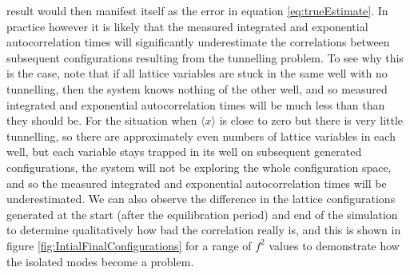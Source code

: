 \documentclass[12pt]{article}
\begin{document}
result would then manifest itself as the error in equation \ref{eq:trueEstimate}. In practice however it is likely that the measured integrated and exponential autocorrelation times will significantly underestimate the correlations between subsequent configurations resulting from the tunnelling problem. To see why this is the case, note that if all lattice variables are stuck in the same well with no tunnelling, then the system knows nothing of the other well, and so measured integrated and exponential autocorrelation times will be much less than than they should be. For the situation when $\langle x \rangle$ is close to zero but there is very little tunnelling, so there are approximately even numbers of lattice variables in each well, but each variable stays trapped in its well on subsequent generated configurations, the system will not be exploring the whole configuration space, and so the measured integrated and exponential autocorrelation times will be underestimated. We can also observe the difference in the lattice configurations generated at the start (after the equilibration period) and end of the simulation to determine qualitatively how bad the correlation really is, and this is shown in figure \ref{fig:IntialFinalConfigurations} for a range of $f^2$ values to demonstrate how the isolated modes become a problem.
\end{document}
